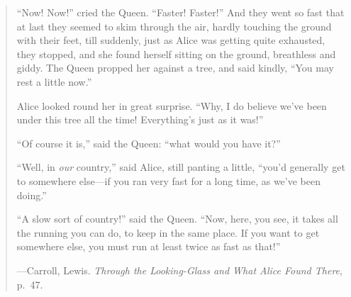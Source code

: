 

\cleardoublepage{}

\thispagestyle{empty} %

\vspace*{50 mm}

\small{}

\begin{quote}
	``Now! Now!'' cried the Queen. 
	``Faster! Faster!'' 
	And they went so fast that at last they seemed to skim through the air, 
	hardly touching the ground with their feet, 
	till suddenly, 
	just as Alice was getting quite exhausted, 
	they stopped, 
	and she found herself sitting on the ground, 
	breathless and giddy. 
	The Queen propped her against a tree, and said kindly, 
	``You may rest a little now.''

	Alice looked round her in great surprise. 
	``Why, I do believe we've been under this tree all the time! 
	Everything's just as it was!''

	``Of course it is,'' said the Queen: ``what would you have it?''

	``Well, in \emph{our} country,'' said Alice, still panting a little, 
	``you'd generally get to somewhere else---if you ran very fast for a long time, 
	as we've been doing.''

	``A slow sort of country!'' said the Queen. 
	``Now, here, you see, it takes all the running you can do, to keep in the same place. 
	If you want to get somewhere else, you must run at least twice as fast as that!''

	\hfill---Carroll, Lewis. \emph{Through the Looking-Glass and What Alice Found There}, p.~47.
\end{quote}

\normalsize{}
